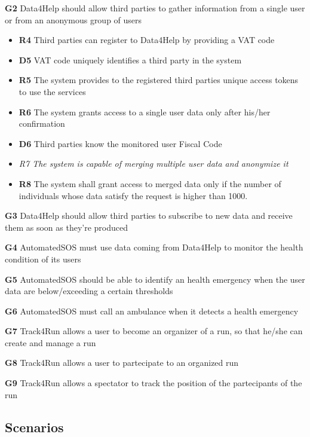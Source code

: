 \item \textbf{G2} Data4Help should allow third parties to gather information from a single user or from an anonymous group of users
\begin{itemize}
\item \textbf{R4} Third parties can register to Data4Help by providing a VAT code
\item \textbf{D5} VAT code uniquely identifies a third party in the system
\item \textbf{R5} The system provides to the registered third parties unique access tokens to use the services
\item \textbf{R6} The system grants access to a single user data only after his/her confirmation
\item \textbf{D6} Third parties know the monitored user Fiscal Code
\item \textit{R7 The system is capable of merging multiple user data and anonymize it}
\item \textbf{R8} The system shall grant access to merged data only if the number	of individuals	whose data satisfy the request is higher than	 1000.	
 	
  

\end{itemize}


\item \textbf{G3} Data4Help should allow third parties to subscribe to new data and receive them as soon as they're produced
\item \textbf{G4} AutomatedSOS must use data coming from Data4Help to monitor the health condition of its users
\item \textbf{G5} AutomatedSOS should be able to identify an health emergency when the user data are below/exceeding a certain thresholds
\item \textbf{G6} AutomatedSOS must call an ambulance when it detects a health emergency
\item \textbf{G7} Track4Run allows a user to become an organizer of a run, so that he/she can create and manage a run
\item \textbf{G8} Track4Run allows a user to partecipate to an organized run
\item \textbf{G9} Track4Run allows a spectator to track the position of the partecipants of the run 
\subsection{Scenarios}
